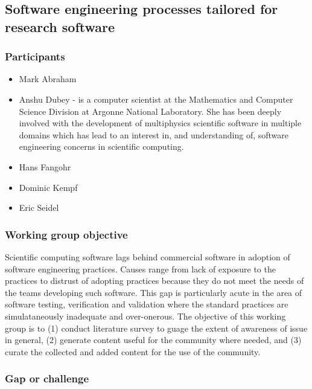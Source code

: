 \subsection{Software engineering processes tailored for research software}
\label{sec:soft-eng}



\subsubsection{Participants}
\begin{itemize}
\item Mark Abraham
\item Anshu Dubey - is a computer scientist at the Mathematics and
  Computer Science Division at Argonne National Laboratory. She has
  been deeply involved with the development of multiphysics scientific
  software in multiple domains which has lead to an interest in, and
  understanding of, software engineering concerns in scientific
  computing. 
\item Hans Fangohr
\item Dominic Kempf
\item Eric Seidel
\end{itemize}
\subsubsection{Working group objective}
Scientific computing software lags behind commercial software in
adoption of software engineering practices. Causes range from lack of
exposure to the practices to distrust of adopting practices because
they do not meet the needs of the teams developing such software. This
gap is particularly acute in the area of software testing,
verification and validation where the standard practices are
simulataneously inadequate and over-onerous. The objective of this
working group is to (1) conduct literature survey to guage the extent
of awareness of issue in general, (2) generate content useful for
the community where needed, and (3) curate the collected and added
content for the use of the community.

\subsubsection{Gap or challenge}

